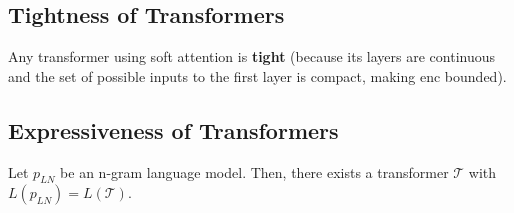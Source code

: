 \subsection*{Tightness of Transformers}
Any transformer using soft attention is \textbf{tight} (because its layers are continuous and the set of possible inputs to the first layer is compact, making $\text{enc}$ bounded).

\subsection*{Expressiveness of Transformers}
Let $p_{LN}$ be an n-gram language model. Then, there exists a transformer $\mathcal{T}$ with $L(p_{LN})=L(\mathcal{T})$.

